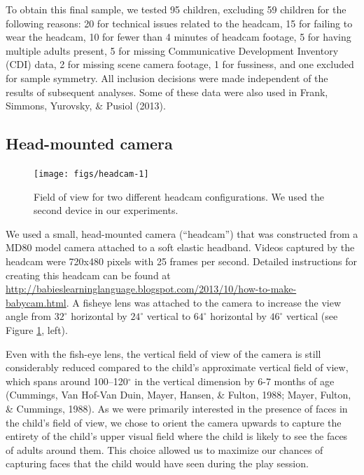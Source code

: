 \documentclass[10pt, letterpaper]{article}
\newenvironment{CodeChunk}{}{}
\begin{document}
To obtain this final sample, we tested 95 children, excluding 59
children for the following reasons: 20 for technical issues related to
the headcam, 15 for failing to wear the headcam, 10 for fewer than 4
minutes of headcam footage, 5 for having multiple adults present, 5 for
missing Communicative Development Inventory (CDI) data, 2 for missing
scene camera footage, 1 for fussiness, and one excluded for sample
symmetry. All inclusion decisions were made independent of the results
of subsequent analyses. Some of these data were also used in Frank,
Simmons, Yurovsky, \& Pusiol (2013).

\subsection{Head-mounted camera}\label{head-mounted-camera}

\begin{CodeChunk}
\begin{figure}[H]

{\centering \texttt{[image: figs/headcam-1]} 

}

\caption[Field of view for two different headcam configurations]{Field of view for two different headcam configurations. We used the second device in our experiments.}\label{fig:headcam}
\end{figure}
\end{CodeChunk}

We used a small, head-mounted camera (``headcam'') that was constructed
from a MD80 model camera attached to a soft elastic headband. Videos
captured by the headcam were 720x480 pixels with 25 frames per second.
Detailed instructions for creating this headcam can be found at
\url{http://babieslearninglanguage.blogspot.com/2013/10/how-to-make-babycam.html}.
A fisheye lens was attached to the camera to increase the view angle
from \(32^{\circ}\) horizontal by \(24^{\circ}\) vertical to
\(64^{\circ}\) horizontal by \(46^{\circ}\) vertical (see Figure
\ref{fig:headcam}, left).

Even with the fish-eye lens, the vertical field of view of the camera is
still considerably reduced compared to the child's approximate vertical
field of view, which spans around 100--120\(^{\circ}\) in the vertical
dimension by 6-7 months of age (Cummings, Van Hof-Van Duin, Mayer,
Hansen, \& Fulton, 1988; Mayer, Fulton, \& Cummings, 1988). As we were
primarily interested in the presence of faces in the child's field of
view, we chose to orient the camera upwards to capture the entirety of
the child's upper visual field where the child is likely to see the
faces of adults around them. This choice allowed us to maximize our
chances of capturing faces that the child would have seen during the
play session.
\end{document}
